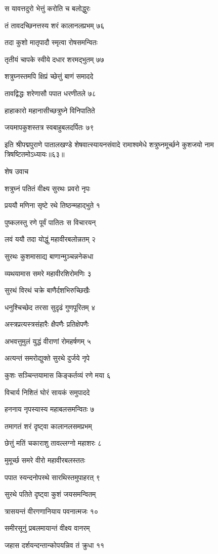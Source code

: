 स यावत्तदुरो भेत्तुं करोति च बलोद्धुरः

तं तावदच्छिनत्तस्य शरं कालानलप्रभम् ७६

तदा कुशो मातृपादौ स्मृत्वा रोषसमन्वितः

तृतीयं चापके स्वीये दधार शरमद्भुतम् ७७

शत्रुघ्नस्तमपि क्षिप्रं च्छेत्तुं बाणं समाददे

तावद्विद्धः शरेणासौ पपात धरणीतले ७८

हाहाकारो महानासीच्छत्रुघ्ने विनिपातिते

जयमापकुशस्तत्र स्वबाहुबलदर्पितः ७९

इति श्रीपद्मपुराणे पातालखण्डे शेषवात्स्यायनसंवादे रामाश्वमेधे शत्रुघ्नमूर्च्छने कुशजयो नाम त्रिषष्टितमोऽध्यायः॥६३॥


शेष उवाच

शत्रुघ्नं पतितं वीक्ष्य सुरथः प्रवरो नृपः

प्रययौ मणिना सृष्टे रथे तिष्ठन्महाद्भुते १

पुष्कलस्तु रणे पूर्वं पातितः स विचारयन्

लवं ययौ तदा योद्धुं महावीरबलोन्नतम् २

सुरथः कुशमासाद्य बाणान्मुञ्चन्ननेकधा

व्यथयामास समरे महावीरशिरोमणिः ३

सुरथं विरथं चक्रे बाणैर्दशभिरुच्छिखैः

धनुश्चिच्छेद तरसा सुदृढं गुणपूरितम् ४

अस्त्रप्रत्यस्त्रसंहारैः क्षैपणैः प्रतिक्षेपणैः

अभवत्तुमुलं युद्धं वीराणां रोमहर्षणम् ५

अत्यन्तं समरोद्युक्ते सुरथे दुर्जये नृपे

कुशः सञ्चिन्तयामास किङ्कर्तव्यं रणे मया ६

विचार्य निशितं घोरं सायकं समुपाददे

हननाय नृपस्यास्य महाबलसमन्वितः ७

तमागतं शरं दृष्ट्वा कालानलसमप्रभम्

छेत्तुं मतिं चकाराशु तावल्लग्नो महाशरः ८

मुमूर्च्छ समरे वीरो महावीरबलस्ततः

पपात स्यन्दनोपस्थे सारथिस्तमुपाहरत् ९

सुरथे पतिते दृष्ट्वा कुशं जयसमन्वितम्

त्रासयन्तं वीरगणानियाय पवनात्मजः १०

समीरसूनुं प्रबलमायान्तं वीक्ष्य वानरम्

जहास दर्शयन्दन्तान्कोपयन्निव तं क्रुधा ११

